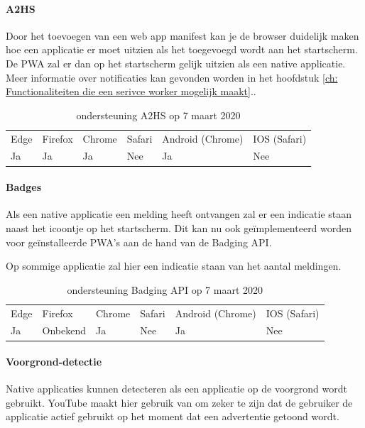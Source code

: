 \paragraph{A2HS}


 Door het toevoegen van een web app manifest kan je de browser duidelijk maken hoe een applicatie er moet uitzien als het toegevoegd wordt aan het startscherm. De PWA zal er dan op het startscherm gelijk uitzien als een native applicatie.
	Meer informatie over notificaties kan gevonden worden in het hoofdstuk \ref{ch: Functionaliteiten die een serivce worker mogelijk maakt}..


\begin{table}[H]
	\centering
	\begin{tabular}{llllll}
		Edge & Firefox & Chrome & Safari & Android (Chrome) & IOS (Safari) \\
		Ja   & Ja      &  Ja     & Nee     & Ja               & Nee          
	\end{tabular}	
	\caption{ondersteuning A2HS op 7 maart 2020 }
\end{table}


\paragraph{Badges}

Als een native applicatie een melding heeft ontvangen zal er een indicatie staan naast het icoontje op het startscherm. Dit kan nu ook geïmplementeerd worden voor geïnstalleerde PWA's aan de hand van de Badging API. \autocite{LePage2020a}

Op sommige applicatie zal hier een indicatie staan van het aantal meldingen.
\begin{table}[H]
	\centering
	\begin{tabular}{llllll}
		Edge & Firefox & Chrome & Safari & Android (Chrome) & IOS (Safari) \\
		Ja   & Onbekend      &  Ja     & Nee     & Ja               & Nee          
	\end{tabular}	
	\caption{ondersteuning Badging API op 7 maart 2020}
\end{table}

\paragraph{Voorgrond-detectie }

Native applicaties kunnen detecteren als een applicatie op de voorgrond wordt gebruikt. YouTube maakt hier gebruik van om zeker te zijn dat de gebruiker de applicatie actief gebruikt op het moment dat een advertentie getoond wordt.

